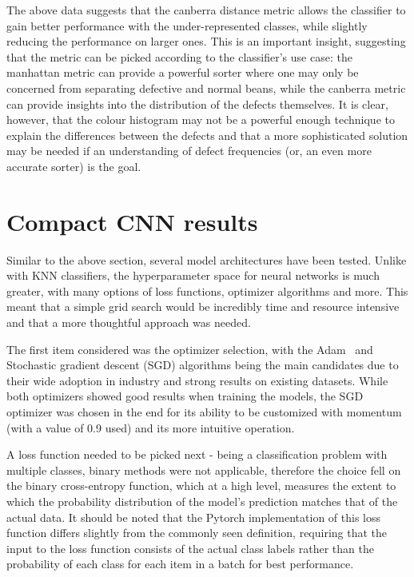 The above data suggests that the canberra distance metric allows the classifier to gain better
performance with the under-represented classes, while slightly reducing the performance on larger ones.
This is an important insight, suggesting that the metric can be picked according to the classifier's use case:
the manhattan metric can provide a powerful sorter where one may only be concerned from separating defective and normal beans,
while the canberra metric can provide insights into the distribution of the defects themselves.
It is clear, however, that the colour histogram may not be a powerful enough technique to explain the differences between
the defects and that a more sophisticated solution may be needed if an understanding of defect frequencies (or, an even more accurate sorter)
is the goal.


\section{Compact CNN results}
\label{sec:compact-cnn-results}
Similar to the above section, several model architectures have been tested.
Unlike with KNN classifiers, the hyperparameter space for neural networks is much greater, with many options of loss functions,
optimizer algorithms and more.
This meant that a simple grid search would be incredibly time and resource intensive and that a more thoughtful approach was needed.

The first item considered was the optimizer selection, with the Adam~\cite{adamGrad} and Stochastic gradient descent (SGD) algorithms being
the main candidates due to their wide adoption in industry and strong results on existing datasets.
While both optimizers showed good results when training the models, the SGD optimizer was chosen in the end for its ability
to be customized with momentum (with a value of 0.9 used) and its more intuitive operation.

A loss function needed to be picked next - being a classification problem with multiple classes, binary methods were not applicable,
therefore the choice fell on the binary cross-entropy function, which at a high level, measures the extent to which the
probability distribution of the model's prediction matches that of the actual data.
It should be noted that the Pytorch implementation of this loss function differs slightly from the commonly seen definition,
requiring that the input to the loss function consists of the actual class labels rather than the probability of each class
for each item in a batch for best performance.

